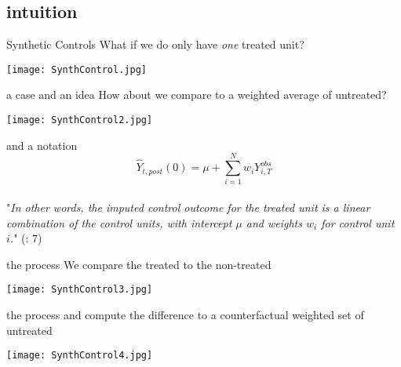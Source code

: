 \documentclass[aspectratio=169]{beamer}
\begin{document}
	\subsection{intuition}

		\begin{frame}{Synthetic Controls}
			What if we do only have \textit{one} treated unit?
			\begin{center}
				\texttt{[image: SynthControl.jpg]}
			\end{center}
		\end{frame}

		\begin{frame}{a case and an idea}
			How about we compare to a weighted average of untreated?
			\begin{center}
				\texttt{[image: SynthControl2.jpg]}
			\end{center}
		\end{frame}

		\begin{frame}{and a notation}
			\begin{equation}
				\hat Y_{t,post}(0)  = \mu + \sum_{i=1}^{N}{w_iY_{i,T}^{obs}}
			\end{equation}
			\\ \vspace*{1.5cm}
			"\textit{In other words, the imputed control outcome for the treated unit is a linear combination of the control units, with intercept $\mu$ and weights $w_i$ for control unit $i$.}" (\cite{Doudchenko2020}: 7)
		\end{frame}

		\begin{frame}{the process}
			We compare the treated to the non-treated
			\begin{center}
				\texttt{[image: SynthControl3.jpg]}
			\end{center}
		\end{frame}

		\begin{frame}{the process}
			and compute the difference to a counterfactual weighted set of untreated
			\begin{center}
				\texttt{[image: SynthControl4.jpg]}
			\end{center}
		\end{frame}
\end{document}
